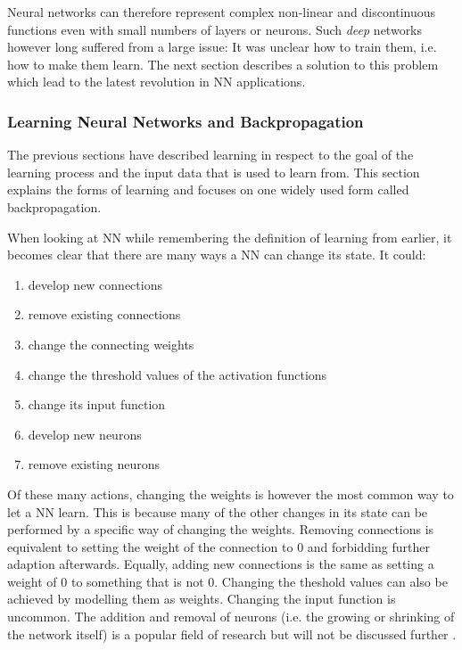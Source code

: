 Neural networks can therefore represent complex non-linear and discontinuous functions
\cite[p.732]{russell2016artificial} even with small numbers of layers or neurons. Such \emph{deep} networks however long
suffered from a large issue: It was unclear how to train them, i.e. how to make them learn. The next section describes a
solution to this problem which lead to the latest revolution in \ac {NN} applications. 

\subsubsection{Learning Neural Networks and Backpropagation}
\label{sec:Backpropagation}


The previous sections have described learning in respect to the goal of the learning process and the input data that is
used to learn from. This section explains the forms of learning and focuses on one widely used form called
backpropagation. 

When looking at \ac {NN} while remembering the definition of learning from earlier, it becomes clear that there are many
ways a \ac {NN} can change its state. It could:

\begin{enumerate}
    \item develop new connections
    \item remove existing connections
    \item change the connecting weights
    \item change the threshold values of the activation functions
    \item change its input function
    \item develop new neurons
    \item remove existing neurons \cite[p.60]{kriesel2007brief} 
\end{enumerate}

Of these many actions, changing the weights is however the most common way to let a \ac {NN} learn. This is because many
of the other changes in its state can be performed by a specific way of changing the weights. Removing connections is
equivalent to setting the weight of the connection to 0 and forbidding further adaption afterwards. Equally, adding new
connections is the same as setting a weight of 0 to something that is not 0. Changing the theshold values can also be
achieved by modelling them as weights. Changing the input function is uncommon. The addition and removal of neurons
(i.e. the growing or shrinking of the network itself) is a popular field of research but will not be discussed further
\cite[p.60]{kriesel2007brief}. 

